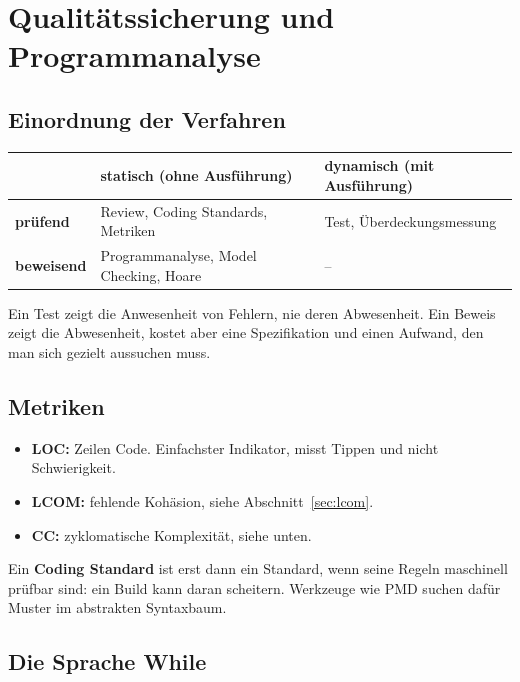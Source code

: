 \documentclass[12pt, a4paper]{article}
\begin{document}
\section{Qualitätssicherung und Programmanalyse}

\subsection{Einordnung der Verfahren}

\begin{center}
\begin{tabular}{lll}
\hline
 & \textbf{statisch} (ohne Ausführung) & \textbf{dynamisch} (mit Ausführung) \\
\hline
\textbf{prüfend}  & Review, Coding Standards, Metriken & Test, Überdeckungsmessung \\
\textbf{beweisend}& Programmanalyse, Model Checking, Hoare & -- \\
\hline
\end{tabular}
\end{center}

Ein Test zeigt die Anwesenheit von Fehlern, nie deren Abwesenheit. Ein Beweis zeigt
die Abwesenheit, kostet aber eine Spezifikation und einen Aufwand, den man sich
gezielt aussuchen muss.

\subsection{Metriken}

\begin{itemize}
  \item \textbf{LOC:} Zeilen Code. Einfachster Indikator, misst Tippen und nicht
        Schwierigkeit.
  \item \textbf{LCOM:} fehlende Kohäsion, siehe Abschnitt~\ref{sec:lcom}.
  \item \textbf{CC:} zyklomatische Komplexität, siehe unten.
\end{itemize}

Ein \textbf{Coding Standard} ist erst dann ein Standard, wenn seine Regeln
maschinell prüfbar sind: ein Build kann daran scheitern. Werkzeuge wie PMD suchen
dafür Muster im abstrakten Syntaxbaum.

\subsection{Die Sprache While}
\end{document}
